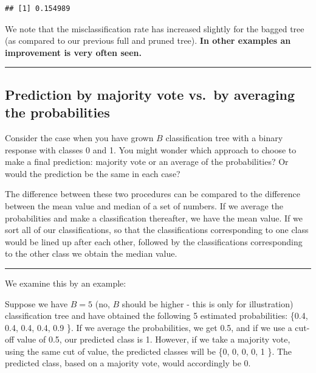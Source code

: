 \documentclass[]{article}
\begin{document}
\begin{verbatim}
## [1] 0.154989
\end{verbatim}

We note that the misclassification rate has increased slightly for the
bagged tree (as compared to our previous full and pruned tree).
\textbf{In other examples an improvement is very often seen.}

\begin{center}\rule{0.5\linewidth}{\linethickness}\end{center}

\hypertarget{prediction-by-majority-vote-vs.by-averaging-the-probabilities}{%
\subsection{Prediction by majority vote vs.~by averaging the
probabilities}\label{prediction-by-majority-vote-vs.by-averaging-the-probabilities}}

Consider the case when you have grown \(B\) classification tree with a
binary response with classes 0 and 1. You might wonder which approach to
choose to make a final prediction: majority vote or an average of the
probabilities? Or would the prediction be the same in each case?

The difference between these two procedures can be compared to the
difference between the mean value and median of a set of numbers. If we
average the probabilities and make a classification thereafter, we have
the mean value. If we sort all of our classifications, so that the
classifications corresponding to one class would be lined up after each
other, followed by the classifications corresponding to the other class
we obtain the median value.

\begin{center}\rule{0.5\linewidth}{\linethickness}\end{center}

We examine this by an example:

Suppose we have \(B=5\) (no, \(B\) should be higher - this is only for
illustration) classification tree and have obtained the following 5
estimated probabilities: \{0.4, 0.4, 0.4, 0.4, 0.9 \}. If we average the
probabilities, we get 0.5, and if we use a cut-off value of 0.5, our
predicted class is 1. However, if we take a majority vote, using the
same cut of value, the predicted classes will be \{0, 0, 0, 0, 1 \}. The
predicted class, based on a majority vote, would accordingly be 0.
\end{document}
